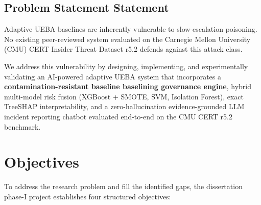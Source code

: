 \documentclass[12pt,a4paper]{report}
\begin{document}
\section{Problem Statement Statement}
Adaptive UEBA baselines are inherently vulnerable to slow-escalation poisoning. No existing peer-reviewed system evaluated on the Carnegie Mellon University (CMU) CERT Insider Threat Dataset r5.2 defends against this attack class. 

We address this vulnerability by designing, implementing, and experimentally validating an AI-powered adaptive UEBA system that incorporates a \textbf{contamination-resistant baseline baselining governance engine}, hybrid multi-model risk fusion (XGBoost + SMOTE, SVM, Isolation Forest), exact TreeSHAP interpretability, and a zero-hallucination evidence-grounded LLM incident reporting chatbot evaluated end-to-end on the CMU CERT r5.2 benchmark.

\chapter{Objectives}
\label{chap:objectives}

To address the research problem and fill the identified gaps, the dissertation phase-I project establishes four structured objectives:
\end{document}
